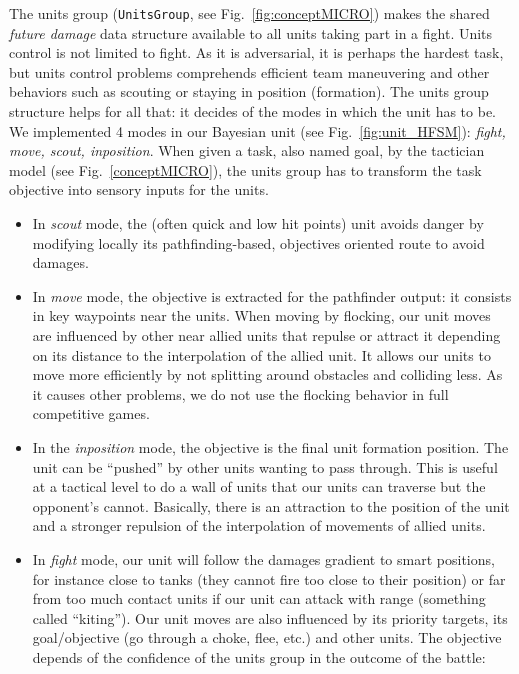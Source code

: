 \label{sec:unitsgroup}
The units group (\texttt{UnitsGroup}, see Fig.~\ref{fig:conceptMICRO}) makes the shared \textit{future damage} data structure available to all units taking part in a fight. Units control is not limited to fight. As it is adversarial, it is perhaps the hardest task, but units control problems comprehends efficient team maneuvering and other behaviors such as scouting or staying in position (formation). The units group structure helps for all that: it decides of the modes in which the unit has to be. We implemented 4 modes in our Bayesian unit (see Fig.~\ref{fig:unit_HFSM}): \textit{fight, move, scout, inposition}. When given a task, also named goal, by the tactician model (see Fig.~\ref{conceptMICRO}), the units group has to transform the task objective into sensory inputs for the units. 
\begin{itemize}
    \item In \textit{scout} mode, the (often quick and low hit points) unit avoids danger by modifying locally its pathfinding-based, objectives oriented route to avoid damages.
    \item In \textit{move} mode, the objective is extracted for the pathfinder output: it consists in key waypoints near the units. When moving by flocking, our unit moves are influenced by other near allied units that repulse or attract it depending on its distance to the interpolation of the allied unit. It allows our units to move more efficiently by not splitting around obstacles and colliding less. As it causes other problems, we do not use the flocking behavior in full competitive games.
    \item In the \textit{inposition} mode, the objective is the final unit formation position. The unit can be ``pushed'' by other units wanting to pass through. This is useful at a tactical level to do a wall of units that our units can traverse but the opponent's cannot. Basically, there is an attraction to the position of the unit and a stronger repulsion of the interpolation of movements of allied units.
    \item In \textit{fight} mode, our unit will follow the damages gradient to smart positions, for instance close to tanks (they cannot fire too close to their position) or far from too much contact units if our unit can attack with range (something called ``kiting''). Our unit moves are also influenced by its priority targets, its goal/objective (go through a choke, flee, etc.) and other units. The objective depends of the confidence of the units group in the outcome of the battle:

\end{itemize}

